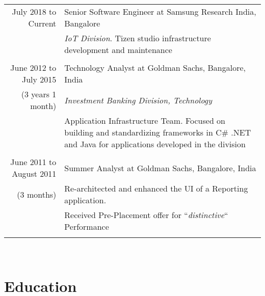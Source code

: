 \documentclass[a4paper,10pt]{article} %
\begin{document}
\begin{tabular}{r|p{12cm}}
July 2018 to Current & Senior Software Engineer at Samsung Research India, Bangalore \\
& \emph{IoT Division}. \small {Tizen studio infrastructure 
development and maintenance}\\
& \\

June 2012 to July 2015 & Technology Analyst at Goldman Sachs, Bangalore, India \\
{(3 years 1 month)}& \emph{Investment Banking Division, Technology}\\ 
& \small {Application Infrastructure Team. Focused on building and standardizing frameworks in C\# .NET and Java for
applications developed in the division}\\
& \\

June 2011 to August 2011 & Summer Analyst at Goldman Sachs, Bangalore, India \\
{(3 months)}& \small{Re-architected and enhanced the UI of a Reporting application.}\\
& \small{ Received Pre-Placement offer for ``\emph{distinctive}`` Performance }\\
& \\

\end{tabular}
\\

\section{Education}
\end{document}
